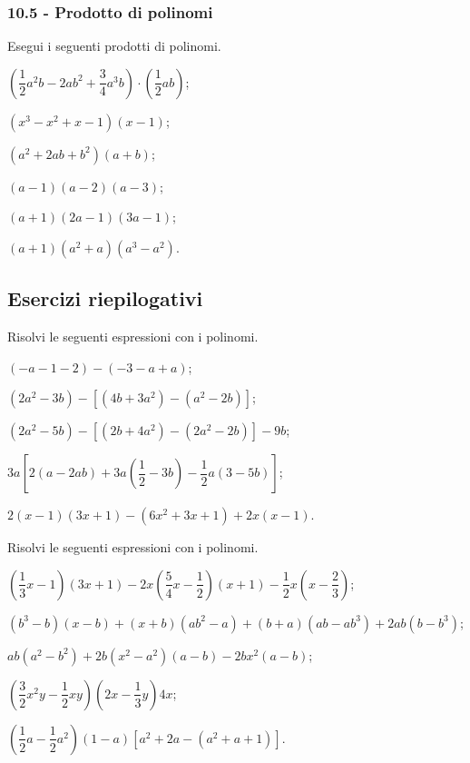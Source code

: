 \subsubsection*{10.5 - Prodotto di polinomi}
\begin{esercizio}
Esegui i seguenti prodotti di polinomi.
\label{ese:10.20}
\begin{multicols}{2}
\begin{enumeratea}
 \item $\left(\dfrac{1}{2}a^{2}b-2{ab}^{2}+\dfrac{3}{4}a^{3}b\right)\cdot\left(\dfrac{1}{2}{ab}\right)$;
 \item $\left(x^{3}-x^{2}+x-1\right)({x}-1)$;
 \item $\left(a^{2}+2{ab}+b^{2}\right)(a+b)$;
 \item $(a-1)(a-2)(a-3)$;
 \item $(a+1)(2a-1)(3a-1)$;
 \item $(a+1)\left(a^{2}+a\right)\left(a^{3}-a^{2}\right)$.
\end{enumeratea}
\end{multicols}
\end{esercizio}


\subsection{Esercizi riepilogativi}

\begin{esercizio}[\Ast]
Risolvi le seguenti espressioni con i polinomi.
 \begin{enumeratea}
 \item $(-a-1-2)-(-3-a+a)$;
 \item $\left(2a^{2}-3b\right)-\left[\left(4b+3a^{2}\right)-\left(a^{2}-2b\right)\right]$;
 \item $\left(2a^{2}-5b\right)-\left[\left(2b+4a^{2}\right)-\left(2a^{2}-2b\right)\right]-9b$;
 \item $3a\left[2(a-2{ab})+3a\left(\dfrac{1}{2}-3b\right)-\dfrac{1}{2}a(3-5b)\right]$;
 \item $2(x-1)(3x+1)-\left(6x^{2}+3x+1\right)+2x(x-1)$.
 \end{enumeratea}
\end{esercizio}

\begin{esercizio}
Risolvi le seguenti espressioni con i polinomi.
 \begin{enumeratea}
 \item $\left(\dfrac{1}{3}x-1\right)(3x+1)-2x\left(\dfrac{5}{4}x-\dfrac{1}{2}\right)(x+1)-\dfrac{1}{2}x\left(x-\dfrac{2}{3}\right)$;
 \item $\left(b^{3}-b\right)(x-b)+(x+b)\left(ab^{2}-a\right)+(b+a)\left(ab-ab^{3}\right)+2ab\left(b-b^{3}\right)$;
 \item $ab\left(a^{2}-b^{2}\right)+2b\left(x^{2}-a^{2}\right)(a-b)-2bx^{2}(a-b)$;
 \item $\left(\dfrac{3}{2}x^{2}y-\dfrac{1}{2}{xy}\right)\left(2x-\dfrac{1}{3}y\right)4x$;
 \item $\left(\dfrac{1}{2}a-\dfrac{1}{2}a^{2}\right)(1-a)\left[a^{2}+2a-\left(a^{2}+a+1\right)\right]$.
 \end{enumeratea}
\end{esercizio}


